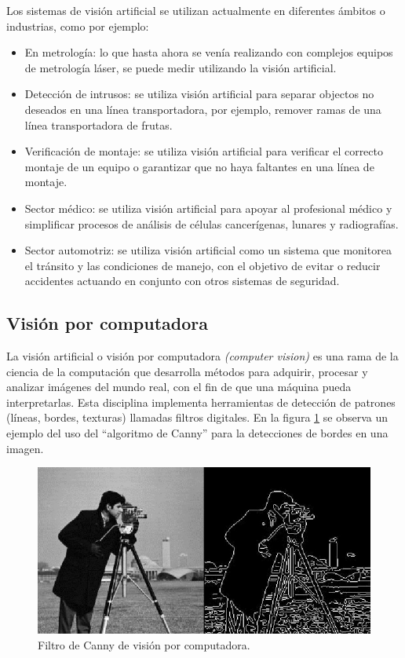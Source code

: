
\newpage

Los sistemas de visión artificial se utilizan actualmente en diferentes ámbitos o industrias, como por ejemplo:
\begin{itemize}
\item En metrología: lo que hasta ahora se venía realizando con complejos equipos de metrología láser, se puede medir utilizando la visión artificial.
\item Detección de intrusos: se utiliza visión artificial para separar objectos no deseados en una línea transportadora, por ejemplo, remover ramas de una línea transportadora de frutas.
\item Verificación de montaje: se utiliza visión artificial para verificar el correcto montaje de un equipo o garantizar que no haya faltantes en una línea de montaje.
\item Sector médico: se utiliza visión artificial para apoyar al profesional médico y simplificar procesos de análisis de células cancerígenas, lunares y radiografías.
\item Sector automotriz: se utiliza visión artificial como un sistema que monitorea el tránsito y las condiciones de manejo, con el objetivo de evitar o reducir accidentes actuando en conjunto con otros sistemas de seguridad.
\end{itemize}

\subsection{Visión por computadora}

La visión artificial o visión por computadora \textit{(computer vision)} \citep{COMPUTER_VISION} es una rama de la ciencia de la computación que desarrolla métodos para adquirir, procesar y analizar imágenes del mundo real, con el fin de que una máquina pueda interpretarlas. Esta disciplina implementa herramientas de detección de patrones (líneas, bordes, texturas) llamadas filtros digitales. En la figura \ref{fig:visionComputadora} se observa un ejemplo del uso del ``algoritmo de Canny'' para la detecciones de bordes en una imagen.

\begin{figure}[ht]
	\centering
	\includegraphics[scale=.55]{./Figures/visionComputadora.jpg}
	\caption{Filtro de Canny de visión por computadora\protect\footnotemark.}
	\label{fig:visionComputadora}
\end{figure}


